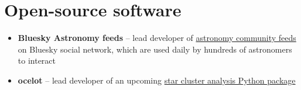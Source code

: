 \section*{Open-source software \href{\cvGitHubLink}{\faGithub}}

\begin{itemize}
    \item \textbf{Bluesky Astronomy feeds} -- lead developer of \href{https://github.com/bluesky-astronomy}{astronomy community feeds} on Bluesky social network, which are used daily by hundreds of astronomers to interact
    \item \textbf{ocelot} -- lead developer of an upcoming \href{https://github.com/emilyhunt/ocelot}{star cluster analysis Python package}
\end{itemize}